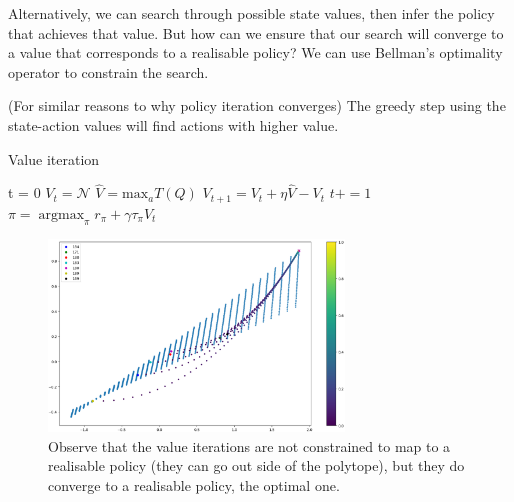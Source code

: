 Alternatively, we can search through possible state values, then infer the policy that achieves that value.
But how can we ensure that our search will converge to a value that corresponds to a realisable policy? We can use Bellman's
optimality operator to constrain the search.

(For similar reasons to why policy iteration converges) The greedy step using the
state-action values will find actions with higher value.

\begin{algorithm}[H]
\caption{Value iteration}
\begin{algorithmic}[1]

  \State t = 0
  \State $V_t = \mathcal N$ 
    \State $\hat V = \text{max}_a T(Q)$  
    \State $V_{t+1} = V_t + \eta \hat V - V_t$ 
    \State $t += 1$
  \EndWhile
  \State $\pi = \mathop{\text{argmax}}_{\pi} r_{\pi} + \gamma \tau_{\pi}V_t$
  \State \algorithmicreturn{ $\pi$}
\EndProcedure

\end{algorithmic}
\end{algorithm}




\begin{figure}[h!]
\centering
\includegraphics[width=0.7\textwidth,height=0.35\textheight]{../../pictures/figures/vi-polytope.png}
\caption{Observe that the value iterations are not constrained to map to a realisable policy
(they can go out side of the polytope), but they do converge to a realisable policy,
the optimal one.}
\end{figure}



